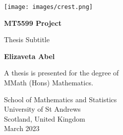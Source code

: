 \begin{titlepage}
    \begin{center}
        \vspace*{1cm} %

        \texttt{[image: images/crest.png]}
        
        \textbf{MT5599 Project}

        \vspace{0.5cm}
        Thesis Subtitle

        \vspace{1.5cm}
        \textbf{Elizaveta Abel}

        \vfill

        A thesis is presented for the degree of \\ 
        MMath (Hons) Mathematics.



        School of Mathematics and Statistics \\
        University of St Andrews \\
        Scotland, United Kingdom \\
        March 2023
        
    \end{center}
\end{titlepage}